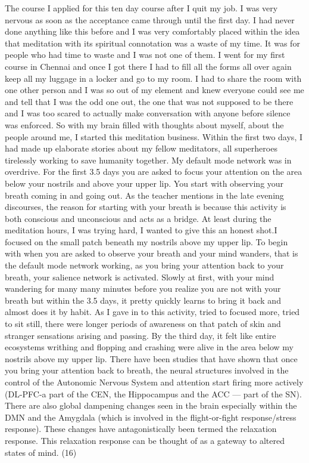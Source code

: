 \documentclass{article}
\begin{document}
The course
I applied for this ten day course after I quit my job. I was very nervous as soon as the acceptance came through until the first day. I had never done anything like this before and I was very comfortably placed within the idea that meditation with its spiritual connotation was a waste of my time. It was for people who had time to waste and I was not one of them. I went for my first course in Chennai and once I got there I had to fill all the forms all over again keep all my luggage in a locker and go to my room. I had to share the room with one other person and I was so out of my element and knew everyone could see me and tell that I was the odd one out, the one that was not supposed to be there and I was too scared to actually make conversation with anyone before silence was enforced. So with my brain filled with thoughts about myself, about the people around me, I started this meditation business. Within the first two days, I had made up elaborate stories about my fellow meditators, all superheroes tirelessly working to save humanity together. My default mode network was in overdrive.
For the first 3.5 days you are asked to focus your attention on the area below your nostrils and above your upper lip. You start with observing your breath coming in and going out. As the teacher mentions in the late evening discourses, the reason for starting with your breath is because this activity is both conscious and unconscious and acts as a bridge.
At least during the meditation hours, I was trying hard, I wanted to give this an honest shot.I focused on the small patch beneath my nostrils above my upper lip. To begin with when you are asked to observe your breath and your mind wanders, that is the default mode network working, as you bring your attention back to your breath, your salience network is activated. Slowly at first, with your mind wandering for many many minutes before you realize you are not with your breath but within the 3.5 days, it pretty quickly learns to bring it back and almost does it by habit. As I gave in to this activity, tried to focused more, tried to sit still, there were longer periods of awareness on that patch of skin and stranger sensations arising and passing. By the third day, it felt like entire ecosystems writhing and flopping and crashing were alive in the area below my nostrils above my upper lip. There have been studies that have shown that once you bring your attention back to breath, the neural structures involved in the control of the Autonomic Nervous System and attention start firing more actively (DL-PFC-a part of the CEN, the Hippocampus and the ACC — part of the SN). There are also global dampening changes seen in the brain especially within the DMN and the Amygdala (which is involved in the flight-or-fight response/stress response). These changes have antagonistically been termed the relaxation response. This relaxation response can be thought of as a gateway to altered states of mind. (16)
\end{document}
